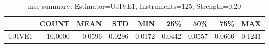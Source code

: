 \begin{table}[ht]
\centering
\caption{mse summary: Estimator=UJIVE1, Instruments=125, Strength=0.20}
\begin{tabular}{lrrrrrrrr}
\toprule
 & COUNT & MEAN & STD & MIN & 25\% & 50\% & 75\% & MAX \\
\midrule
UJIVE1 & 10.0000 & 0.0596 & 0.0296 & 0.0172 & 0.0442 & 0.0557 & 0.0666 & 0.1241 \\
\bottomrule
\end{tabular}
\end{table}
